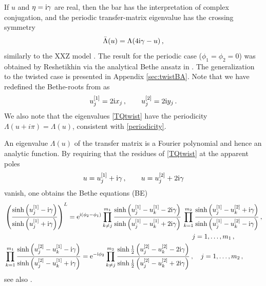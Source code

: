 \documentclass[12pt]{article}
\numberwithin{equation}{section}
\newcommand{\BR}[2]{u^{[#1]}_{#2}}
\newcommand{\ri}{{\rm i}}
\newcommand{\re}{{\rm e}}
\begin{document}
	If $u$ and $\eta=\ri \gamma$ are real, then the bar has the interpretation of complex conjugation, and the periodic transfer-matrix eigenvalue has the crossing symmetry
	\begin{equation}
		\bar{\Lambda}(u) = \Lambda(4\ri \gamma-u) \,,
	\end{equation}
	similarly to the XXZ model \cite{Resh83}.
	The result for the periodic case ($\phi_1=\phi_2=0$) was obtained by Reshetikhin  via the analytical Bethe ansatz in \cite{Resh87}. The generalization to the twisted case is presented in Appendix \ref{sec:twistBA}.
	Note that we have redefined the Bethe-roots from \cite{Resh87} as
	\begin{align}
		u^{[1]}_j=2\ri x_j \,, \qquad u^{[2]}_j=2\ri y_j \,.
	\end{align}
	We also note that the eigenvalues \eqref{TQtwist} have the periodicity $\Lambda(u+i\pi) = \Lambda(u)$, consistent with \eqref{periodicity}.
	
	An eigenvalue $\Lambda(u)$ of the transfer matrix is a Fourier polynomial and hence an analytic function. By requiring that the residues of \eqref{TQtwist} at the apparent poles
	\begin{equation}
		u= \BR{1}{j}+\ri \gamma\,, \qquad
		u= \BR{2}{j}+2\ri \gamma
	\end{equation}
	vanish, one obtains the Bethe equations (BE) 
	\begin{equation}
		\begin{aligned}\label{Twisted_BAE}
			&\left( \frac{\sinh\left(\BR{1}{j}-\ri \gamma\right)}{\sinh\left(\BR{1}{j}+\ri \gamma\right)} \right)^L
			= \re^{\ri(\phi_2 - \phi_1)}\prod_{k\neq j}^{m_1} \frac{\sinh\left(\BR{1}{j}-\BR{1}{k}-2\ri \gamma\right)}{\sinh\left(\BR{1}{j}-\BR{1}{k}+2\ri \gamma\right)}\,
			\prod_{k=1}^{m_2} \frac{\sinh\left(\BR{1}{j}-\BR{2}{k}+\ri \gamma\right)}{\sinh\left(\BR{1}{j}-\BR{2}{k}-\ri \gamma\right)}\,,  \\
			& \qquad\qquad\qquad\qquad\qquad\qquad\qquad\qquad\qquad\qquad\qquad\qquad\qquad\qquad j=1,\dots,m_1\,,\\
			&\prod_{k=1}^{m_1} \frac{\sinh\left(\BR{2}{j}-\BR{1}{k}-\ri \gamma\right)}{\sinh\left(\BR{2}{j}-\BR{1}{k}+\ri \gamma\right)}
			= \re^{-\ri \phi_2}\prod_{k\neq j}^{m_2} \frac{\sinh\frac12\left(\BR{2}{j}-\BR{2}{k}-2\ri \gamma\right)}{\sinh\frac12\left(\BR{2}{j}-\BR{2}{k}+2\ri \gamma\right)}\,,
			\quad j=1,\dots,m_2\,,
		\end{aligned}
	\end{equation}
	see also \cite{Resh87,VeLo91a}.
	
\end{document}
